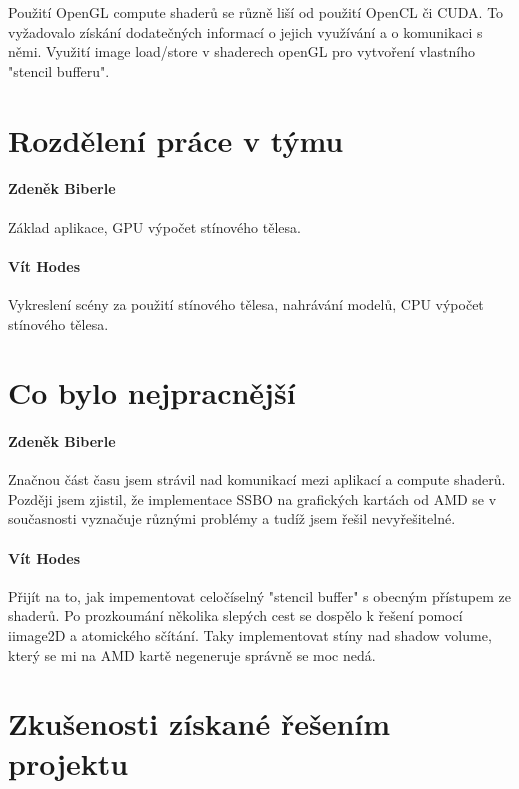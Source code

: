 \documentclass[11pt,a4paper]{article}
\begin{document}
Použití OpenGL compute shaderů se různě liší od použití OpenCL či CUDA. To vyžadovalo získání dodatečných informací o jejich využívání a o komunikaci s němi.
Využití image load/store v shaderech openGL pro vytvoření vlastního "stencil bufferu".

\section{Rozdělení práce v týmu}

\paragraph{Zdeněk Biberle} Základ aplikace, GPU výpočet stínového tělesa.
\paragraph{Vít Hodes} Vykreslení scény za použití stínového tělesa, nahrávání modelů, CPU výpočet stínového tělesa.

\section{Co bylo nejpracnější}

\paragraph{Zdeněk Biberle}
Značnou část času jsem strávil nad komunikací mezi aplikací a compute shaderů. Později jsem zjistil, že implementace SSBO na grafických kartách od AMD se v současnosti vyznačuje různými problémy a tudíž jsem řešil nevyřešitelné.

\paragraph{Vít Hodes} Přijít na to, jak impementovat celočíselný "stencil buffer" s obecným přístupem ze shaderů. Po prozkoumání několika slepých cest se dospělo k řešení pomocí iimage2D a atomického sčítání. Taky implementovat stíny nad shadow volume, který se mi na AMD kartě negeneruje správně se moc nedá.

\section{Zkušenosti získané řešením projektu}
\end{document}
